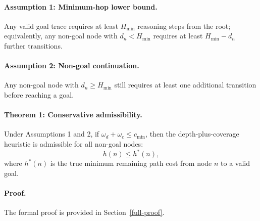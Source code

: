 \documentclass[11pt]{article}
\begin{document}
\paragraph{Assumption 1: Minimum-hop lower bound.}
Any valid goal trace requires at least \(H_{\min}\) reasoning steps from the root; equivalently, any non-goal node with \(d_n < H_{\min}\) requires at least \(H_{\min}-d_n\) further transitions.

\paragraph{Assumption 2: Non-goal continuation.}
Any non-goal node with \(d_n\geq H_{\min}\) still requires at least one additional transition before reaching a goal.

\paragraph{Theorem 1: Conservative admissibility.}
Under Assumptions 1 and 2, if \(\omega_d+\omega_c\leq c_{\min}\), then the depth-plus-coverage heuristic is admissible for all non-goal nodes:
\[
h(n)\leq h^*(n),
\]
where \(h^*(n)\) is the true minimum remaining path cost from node \(n\) to a valid goal.

\paragraph{Proof.}
The formal proof is provided in Section~\ref{full-proof}.
\end{document}
